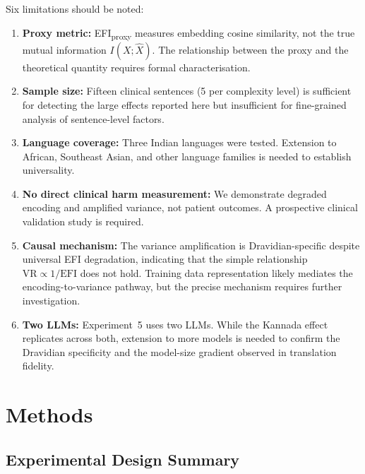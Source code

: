 \documentclass[11pt,a4paper]{article}
\begin{document}
Six limitations should be noted:

\begin{enumerate}
    \item \textbf{Proxy metric:} EFI\textsubscript{proxy} measures embedding cosine similarity, not the true mutual information $I(X; \hat{X})$. The relationship between the proxy and the theoretical quantity requires formal characterisation.
    \item \textbf{Sample size:} Fifteen clinical sentences (5 per complexity level) is sufficient for detecting the large effects reported here but insufficient for fine-grained analysis of sentence-level factors.
    \item \textbf{Language coverage:} Three Indian languages were tested. Extension to African, Southeast Asian, and other language families is needed to establish universality.
    \item \textbf{No direct clinical harm measurement:} We demonstrate degraded encoding and amplified variance, not patient outcomes. A prospective clinical validation study is required.
    \item \textbf{Causal mechanism:} The variance amplification is Dravidian-specific despite universal EFI degradation, indicating that the simple relationship $\text{VR} \propto 1/\text{EFI}$ does not hold. Training data representation likely mediates the encoding-to-variance pathway, but the precise mechanism requires further investigation.
    \item \textbf{Two LLMs:} Experiment~5 uses two LLMs. While the Kannada effect replicates across both, extension to more models is needed to confirm the Dravidian specificity and the model-size gradient observed in translation fidelity.
\end{enumerate}

\section{Methods}

\subsection{Experimental Design Summary}
\end{document}
